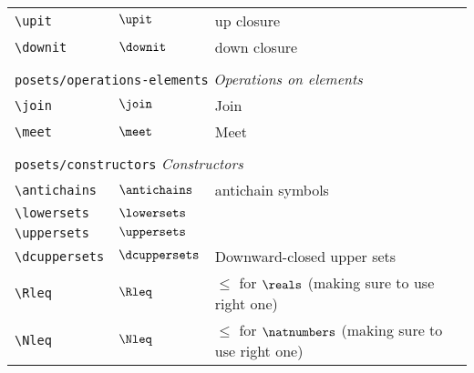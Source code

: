\begin{longtable}{lll}
  {\color[rgb]{0.5,0.5,0.5}\texttt{\textbackslash upit}}                                                    & $\upit$                    & up closure\\
  {\color[rgb]{0.5,0.5,0.5}\texttt{\textbackslash downit}}                                                  & $\downit$                  & down closure                                            \\
  &                            &                                                         \\
  \multicolumn{3}{l}{{\color[rgb]{0.5,0.5,0.5}\texttt{posets/operations-elements}} \emph{Operations on elements}}
  \\
  \hline
  {\color[rgb]{0.5,0.5,0.5}\texttt{\textbackslash join}}                                                    & $\join$                    & Join\\
  {\color[rgb]{0.5,0.5,0.5}\texttt{\textbackslash meet}}                                                    & $\meet$                    & Meet                                                    \\
  &                            &                                                         \\
  \multicolumn{3}{l}{{\color[rgb]{0.5,0.5,0.5}\texttt{posets/constructors}} \emph{Constructors}}
  \\
  \hline
  {\color[rgb]{0.5,0.5,0.5}\texttt{\textbackslash antichains}}                                              & $\antichains$              & antichain symbols\\
  {\color[rgb]{0.5,0.5,0.5}\texttt{\textbackslash lowersets}}                                               & $\lowersets$               & \\
  {\color[rgb]{0.5,0.5,0.5}\texttt{\textbackslash uppersets}}                                               & $\uppersets$               & \\
  {\color[rgb]{0.5,0.5,0.5}\texttt{\textbackslash dcuppersets}}                                             & $\dcuppersets$             & Downward-closed upper sets\\
  {\color[rgb]{0.5,0.5,0.5}\texttt{\textbackslash Rleq}}                                                    & $\Rleq$                    & $\leq$ for $\reals$ (making sure to use right one)\\
  {\color[rgb]{0.5,0.5,0.5}\texttt{\textbackslash Nleq}}                                                    & $\Nleq$                    & $\leq$ for $\natnumbers$ (making sure to use right one)\\

\end{longtable}
